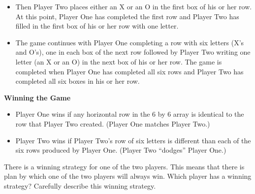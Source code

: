 \begin{previewactivity}
\begin{itemize}
\item Then Player Two places either an X or an O in the first box of his or her row.  At this point, Player One has completed the first row and Player Two has filled in the first box of his or her row with one letter.

\item The game continues with Player One completing a row with six letters (X's and O's), one in each box of the next row followed by Player Two writing one letter (an X or an O) in the next box of his or her row.  The game is completed when Player One has completed all six rows and Player Two has completed all six boxes in his or her row.
\end{itemize}

\textbf{Winning the Game}
\begin{itemize}
\item Player One wins if any horizontal row in the 6 by 6 array is identical to the row that Player Two created.  (Player One matches Player Two.)

\item Player Two wins if Player Two's row of six letters is different than each of the six rows produced by Player One.  (Player Two ``dodges'' Player One.)
\end{itemize}

There is a winning strategy for one of the two players.  This means that there is plan by which one of the two players will always win.  Which player has a winning strategy?  Carefully describe this winning strategy.
\end{previewactivity}
\hbreak
%
